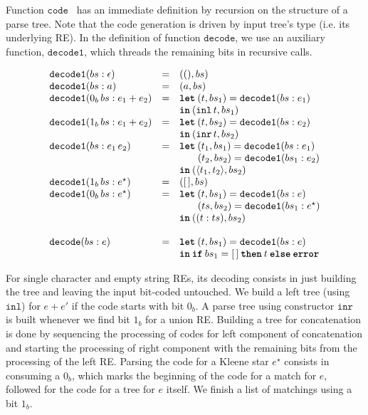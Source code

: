 \documentclass[review]{elsarticle}
\newcommand{\inl}{\ensuremath{\texttt{inl}}}
\newcommand{\inr}{\ensuremath{\texttt{inr}}}
\newcommand{\code}{\ensuremath{\texttt{code}}}
\newcommand{\decodee}{\ensuremath{\texttt{decode}}}
\newcommand{\decodeo}{\ensuremath{\texttt{decode1}}}
\newcommand{\leti}{\ensuremath{\textbf{\texttt{let}}}}
\newcommand{\iin}{\ensuremath{\textbf{\texttt{in}}}}
\newcommand{\iif}{\ensuremath{\textbf{\texttt{if}}}}
\newcommand{\tthen}{\ensuremath{\textbf{\texttt{then}}}}
\newcommand{\eelse}{\ensuremath{\textbf{\texttt{else}}}}
\newcommand{\eerror}{\ensuremath{\textbf{\texttt{error}}}}
\theoremstyle{definition}
\begin{document}
Function \code~ has an immediate definition by recursion on the structure of a parse tree.
Note that the code generation is driven by input tree's type (i.e. its underlying RE).
In the definition of function \decodee, we use an auxiliary function, \decodeo, which 
threads the remaining bits in recursive calls.

\[
\begin{array}{lcl}
  \decodeo (bs : \epsilon) & = & ((), bs) \\
  \decodeo (bs : a)        & = & (a , bs) \\
  \decodeo (0_b\,bs : e_1 + e_2) & = & \leti\:(t,bs_1) = \decodeo (bs : e_1)\\
                                 &   & \iin\:(\inl\,t,bs_1)\\ 
  \decodeo (1_b\,bs : e_1 + e_2) & = & \leti\:(t,bs_2) = \decodeo (bs : e_2)\\
                                 &   & \iin\:(\inr\,t,bs_2)\\ 
  \decodeo (bs : e_1\,e_2) & = & \leti\:(t_1,bs_1) = \decodeo(bs : e_1) \\
                           &   & \,\,\,\,\,\,\,\,\,\,\,(t_2,bs_2) = \decodeo(bs_1 : e_2)\\
                           &   & \iin\:(\langle t_1,t_2\rangle, bs_2)\\
  \decodeo (1_b\,bs : e^\star) & = & ([\,],bs)\\
  \decodeo (0_b\,bs : e^\star) & = & \leti\:(t,bs_1) = \decodeo (bs : e)\\
                               &   & \,\,\,\,\,\,\,\,\,\,\,(ts,bs_2) = \decodeo(bs_1 : e ^\star) \\ 
                               &   & \iin\: ((t : ts), bs_2)\\
  \\
  \decodee (bs : e) & = & \leti\:(t,bs_1) = \decodeo(bs : e)\\
                    &   & \iin\:\iif\:bs_1 = [\,]\:\tthen\:t\:\eelse\:\eerror \\
\end{array}
\]

For single character and empty string REs, its decoding consists in just building
the tree and leaving the input bit-coded untouched. We build a left tree (using \inl)
for $e + e'$ if the code starts with bit $0_b$. A parse tree using constructor \inr~ is built
whenever we find bit $1_b$ for a union RE. Building a tree for concatenation is done by
sequencing the processing of codes for left component of concatenation and starting the
processing of right component with the remaining bits from the processing of the
left RE. Parsing the code for a Kleene star $e^\star$ consists in consuming a $0_b$, which
marks the beginning of the code for a match for $e$, followed for the code for a
tree for $e$ itself. We finish a list of matchings using a bit $1_b$.
\end{document}
